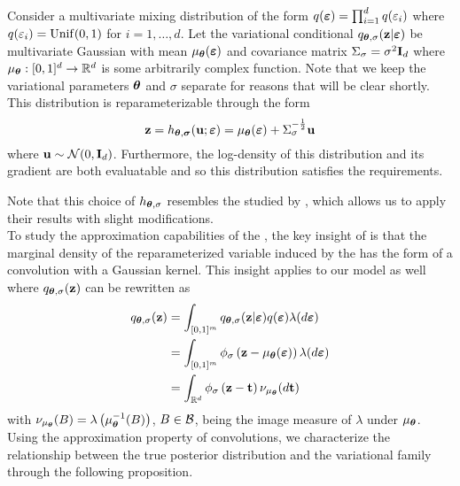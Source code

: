\documentclass[10pt]{article}
\begin{document}
Consider a multivariate mixing distribution of the form $q(\bm{\varepsilon})=\prod_{i=1}^dq(\varepsilon_i)$ where $q(\varepsilon_i)=\mathrm{Unif}(0,1)$ for $i=1,\ldots,d$. Let the variational conditional $q_{{\bm{\theta}},\sigma}(\mathbf{z}|\bm{\varepsilon})$ be multivariate Gaussian with mean $\mu_{{\bm{\theta}}}(\bm{\varepsilon})$ and covariance matrix $\Sigma_{\sigma}=\sigma^2\mathbf{I}_d$ where $\mu_{\bm{\theta}}:[0,1]^d\rightarrow\mathbb{R}^d$ is some arbitrarily complex function. Note that we keep the variational parameters ${\bm{\theta}}$ and $\sigma$ separate for reasons that will be clear shortly. This distribution is reparameterizable through the form
\[
\mathbf{z} = h_{{\bm{\theta}},{\bm{\sigma}}}(\mathbf{u};\bm{\varepsilon}) = \mu_{\bm{\theta}}(\bm{\varepsilon}) + \Sigma_{\sigma}^{-\frac{1}{2}}\mathbf{u}
\]
where $\mathbf{u}\sim \mathcal{N}(0,\mathbf{I}_d)$. Furthermore, the log-density of this distribution and its gradient are both evaluatable and so this distribution satisfies the \uivi requirements.
\iffalse
Furthermore, its log-density and its gradient are given by
\begin{align*}
\log q_{\theta,\sigma}(z|\bfeps) &= -\frac{1}{2}\log\left(2\pi\sigma^2\right)-\frac{1}{2\sigma^2}\left(z-\mu_\theta(\bfeps)\right)^2 \;, \\
\nabla_z \log q_{\theta,\sigma}(z|\bfeps) &= -\frac{1}{\sigma^2}\left(z-\mu_\theta(\bfeps)\right) \;.
\end{align*}
The above properties suggest that the variational family induced by these choices satisfy the \uivi requirements.
\fi
Note that this choice of $h_{{\bm{\theta}},\sigma}$ resembles the \nllvm studied by \citet{Plummer:2021}, which allows us to apply their results with slight modifications.
\\

To study the approximation capabilities of the \nllvm, the key insight of \citet{Plummer:2021} is that the marginal density of the reparameterized variable induced by the \nllvm has the form of a convolution with a Gaussian kernel. This insight applies to our \uivi model as well where $q_{{\bm{\theta}},\sigma}(\mathbf{z})$ can be rewritten as
\begin{align*}
q_{{\bm{\theta}},\sigma}(\mathbf{z}) &= \int_{[0,1]^m} q_{{\bm{\theta}},\sigma}(\mathbf{z}|\bm{\varepsilon})q(\bm{\varepsilon})\lambda(d\bm{\varepsilon}) \\
&= \int_{[0,1]^m} \phi_\sigma\left(\mathbf{z}-\mu_{\bm{\theta}}(\bm{\varepsilon})\right)\lambda(d\bm{\varepsilon}) \\
&= \int_{\mathbb{R}^d} \phi_\sigma\left(\mathbf{z}-\mathbf{t}\right)\nu_{\mu_{\bm{\theta}}}(d\mathbf{t})
\end{align*}
with $\nu_{\mu_{\bm{\theta}}}(B)=\lambda\left(\mu_{\bm{\theta}}^{-1}(B)\right)$, $B\in\mathcal{B}$, being the image measure of $\lambda$ under $\mu_{\bm{\theta}}$. Using the approximation property of convolutions, we characterize the relationship between the true posterior distribution and the variational family through the following proposition.
\end{document}
